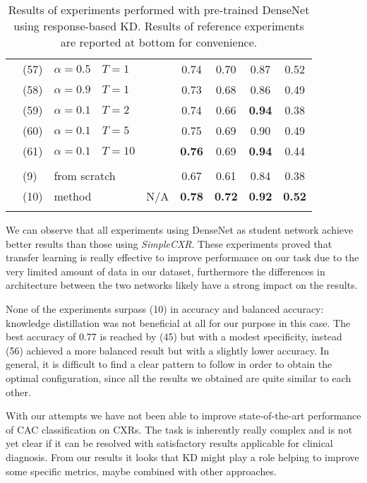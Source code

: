 \begin{table}
\begin{tabular}{c|lll|c|c|c|c|c|}
        & (57) & $\alpha=0.5$ & $T=1$  &                      &         0.74  &         0.70  &         0.87  &         0.52  \\
        & (58) & $\alpha=0.9$ & $T=1$  &                      &         0.73  &         0.68  &         0.86  &         0.49  \\
        & (59) & $\alpha=0.1$ & $T=2$  &                      &         0.74  &         0.66  & \textbf{0.94} &         0.38  \\
        & (60) & $\alpha=0.1$ & $T=5$  &                      &         0.75  &         0.69  &         0.90  &         0.49  \\
        & (61) & $\alpha=0.1$ & $T=10$ &                      & \textbf{0.76} &         0.69  & \textbf{0.94} &         0.44  \\
        \hhline{~--------}
        \multicolumn{8}{c}{} \\
        \hhline{~--------}
        \multirow{2}{*}{}
        & (9)  & \multicolumn{2}{l|}{from scratch}              &                      \cellcolor{gray!25} &         0.67  &         0.61  &         0.84  &         0.38  \\
        & (10) & \multicolumn{2}{l|}{method \cite{iodice_2022}} & \multirow{-2}{*}{N/A}\cellcolor{gray!25} & \textbf{0.78} & \textbf{0.72} & \textbf{0.92} & \textbf{0.52} \\
        \hhline{~--------}
    \end{tabular}
    \caption{Results of experiments performed with pre-trained DenseNet using response-based KD. Results of reference experiments are reported at bottom for convenience.}
    \label{tab:cxr_response_based_kd_and_transfer_learning}
\end{table}

We can observe that all experiments using DenseNet as student network achieve better results than those using \emph{SimpleCXR}.
These experiments proved that transfer learning is really effective to improve performance on our task due to the very limited amount of data in our dataset, furthermore  the differences in architecture between the two networks likely have a strong impact on the results.

None of the experiments surpass (10) in accuracy and balanced accuracy: knowledge distillation was not beneficial at all for our purpose in this case.
The best accuracy of 0.77 is reached by (45) but with a modest specificity, instead (56) achieved a more balanced result but with a slightly lower accuracy.
In general, it is difficult to find a clear pattern to follow in order to obtain the optimal configuration, since all the results we obtained are quite similar to each other.

With our attempts we have not been able to improve state-of-the-art performance of CAC classification on CXRs.
The task is inherently really complex and is not yet clear if it can be resolved with satisfactory results applicable for clinical diagnosis.
From our results it looks that KD might play a role helping to improve some specific metrics, maybe combined with other approaches.
